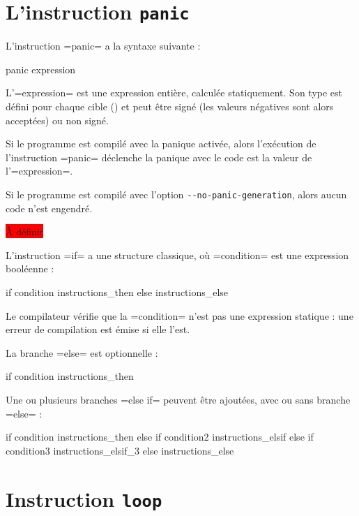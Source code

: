 \section{L'instruction \texttt{panic}}

L'instruction \plm=panic= a la syntaxe suivante :
\begin{PLM}
panic expression
\end{PLM}

L'\plm=expression= est une expression entière, calculée statiquement. Son type est défini pour chaque cible () et peut être signé (les valeurs négatives sont alors acceptées) ou non signé.

Si le programme est compilé avec la panique activée, alors l'exécution de l'instruction \plm=panic= déclenche la panique avec le code est la valeur de l'\plm=expression=.

Si le programme est compilé avec l'option \texttt{-{}-no-panic-generation}, alors aucun code n'est engendré.





\colorbox{red}{À définir}



L'instruction \plm=if= a une structure classique, où \plm=condition= est une expression booléenne :
\begin{PLM}
if condition {
  instructions_then
}else{
  instructions_else
}
\end{PLM}

Le compilateur vérifie que la \plm=condition= n'est pas une expression statique : une erreur de compilation est émise si elle l'est.

La branche \plm=else= est optionnelle :
\begin{PLM}
if condition {
  instructions_then
}
\end{PLM}


Une ou plusieurs branches \plm=else if= peuvent être ajoutées, avec ou sans branche \plm=else= :
\begin{PLM}
if condition {
  instructions_then
}else if condition2 {
  instructions_elsif
}else if condition3 {
  instructions_elsif_3
}else{
  instructions_else
}
\end{PLM}


\section{Instruction \texttt{loop}}

